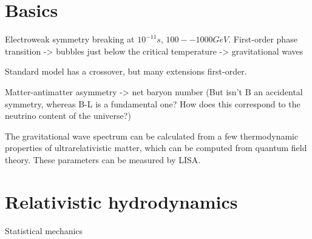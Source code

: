 \section{Basics}
Electroweak symmetry breaking at $10^{-11} s$, $100 -- 1000 GeV$.
First-order phase transition
-> bubbles just below the critical temperature
-> gravitational waves

Standard model has a crossover, but many extensions first-order.

Matter-antimatter asymmetry -> net baryon number
(But isn't B an accidental symmetry, whereas B-L is a fundamental one?
How does this correspond to the neutrino content of the universe?)
\cite{lecture_notes}

The gravitational wave spectrum can be calculated from a few thermodynamic properties of ultrarelativistic matter, which can be computed from quantum field theory.
These parameters can be measured by LISA.

\section{Relativistic hydrodynamics}
Statistical mechanics \cite{huang_statistical_1987}
\cite{schroeder_thermal_2000}
\cite[ch. 4]{lecture_notes}


